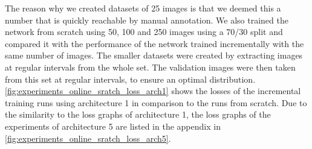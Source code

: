 The reason why we created datasets of 25 images is that we deemed this a number that is quickly reachable by manual annotation. We also trained the network from scratch using 50, 100 and 250 images using a 70/30 split and compared it with the performance of the network trained incrementally with the same number of images. The smaller datasets were created by extracting images at regular intervals from the whole set. The validation images were then taken from this set at regular intervals, to ensure an optimal distribution. \fig \ref{fig:experiments_online_sratch_loss_arch1} shows the losses of the incremental training runs using architecture 1 in comparison to the runs from scratch. Due to the similarity to the loss graphs of architecture 1, the loss graphs of the experiments of architecture 5 are listed in the appendix in \fig \ref{fig:experiments_online_sratch_loss_arch5}.

